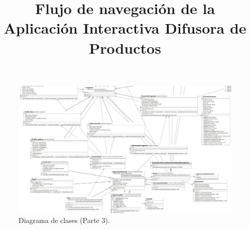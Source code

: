 \FloatBarrier
\begin{figure}[htbp!]
		\centering
			\includegraphics[width=1 \textwidth]{imagenes/Diagramas_UserApp/Nuevos_diagramas/diagrama2_3}
		\caption{Diagrama de clases (Parte 3).}
		\label{image:clases3}
\end{figure}
\FloatBarrier

\title{\textbf{Flujo de navegación de la Aplicación Interactiva Difusora de Productos}\\ \par}

